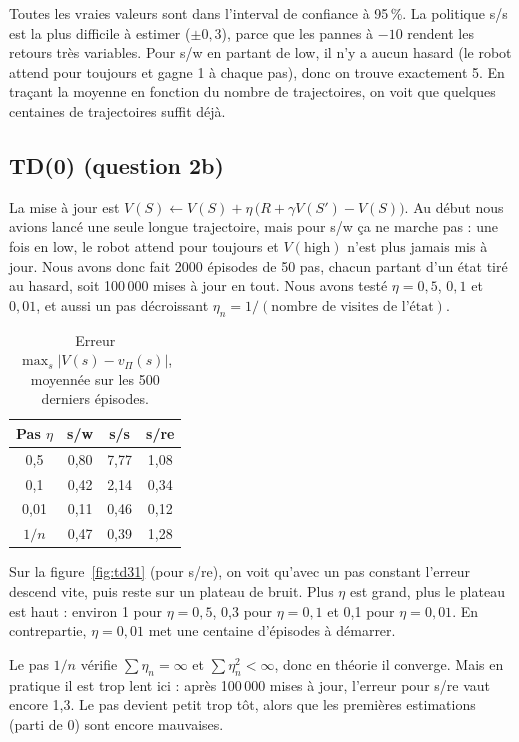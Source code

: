 \documentclass[11pt,a4paper]{article}
\begin{document}
Toutes les vraies valeurs sont dans l'interval de confiance à 95\,\%. La politique s/s est la plus difficile à estimer ($\pm 0,3$), parce que les pannes à $-10$ rendent les retours très variables. Pour s/w en partant de low, il n'y a aucun hasard (le robot attend pour toujours et gagne 1 à chaque pas), donc on trouve exactement 5. En traçant la moyenne en fonction du nombre de trajectoires, on voit que quelques centaines de trajectoires suffit déjà.

\subsection{TD(0) (question 2b)}

La mise à jour est $V(S) \leftarrow V(S) + \eta\,\big(R + \gamma V(S') - V(S)\big)$. Au début nous avions lancé une seule longue trajectoire, mais pour s/w ça ne marche pas : une fois en low, le robot attend pour toujours et $V(\text{high})$ n'est plus jamais mis à jour. Nous avons donc fait 2000 épisodes de 50 pas, chacun partant d'un état tiré au hasard, soit 100\,000 mises à jour en tout. Nous avons testé $\eta = 0,5$, $0,1$ et $0,01$, et aussi un pas décroissant $\eta_n = 1/(\text{nombre de visites de l'état})$.

\begin{table}[H]
  \centering
  \begin{tabular}{cccc}
    \toprule
    Pas $\eta$ & s/w & s/s & s/re \\
    \midrule
    0,5  & 0,80 & 7,77 & 1,08 \\
    0,1  & 0,42 & 2,14 & 0,34 \\
    0,01 & 0,11 & 0,46 & 0,12 \\
    $1/n$ & 0,47 & 0,39 & 1,28 \\
    \bottomrule
  \end{tabular}
  \caption{Erreur $\max_s |V(s) - v_\Pi(s)|$, moyennée sur les 500 derniers épisodes.}
\end{table}

Sur la figure~\ref{fig:td31} (pour s/re), on voit qu'avec un pas constant l'erreur descend vite, puis reste sur un \og plateau\fg{} de bruit. Plus $\eta$ est grand, plus le plateau est haut : environ 1 pour $\eta = 0,5$, 0,3 pour $\eta = 0,1$ et 0,1 pour $\eta = 0,01$. En contrepartie, $\eta = 0,01$ met une centaine d'épisodes à démarrer.

Le pas $1/n$ vérifie $\sum \eta_n = \infty$ et $\sum \eta_n^2 < \infty$, donc en théorie il converge. Mais en pratique il est trop lent ici : après 100\,000 mises à jour, l'erreur pour s/re vaut encore 1,3. Le pas devient petit trop tôt, alors que les premières estimations (parti de 0) sont encore mauvaises.
\end{document}
